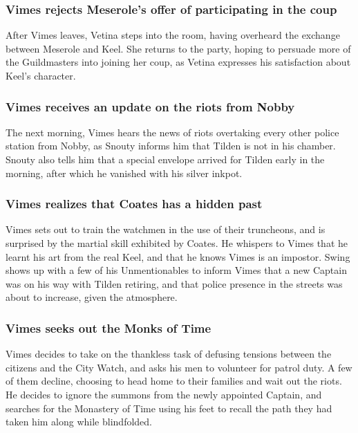 \subsubsection{\Gls{Vimes} rejects \Gls{Meserole}'s offer of participating in the coup}
After \Gls{Vimes} leaves, \Gls{Vetina} steps into the room, having overheard the exchange between
\Gls{Meserole} and \Gls{Keel}. She returns to the party, hoping to persuade more of the Guildmasters
into joining her coup, as \Gls{Vetina} expresses his satisfaction about \Gls{Keel}'s character.

\subsubsection{\Gls{Vimes} receives an update on the riots from \Gls{Nobby}}
The next morning, \Gls{Vimes} hears the news of riots overtaking every other police station from
\Gls{Nobby}, as \Gls{Snouty} informs him that \Gls{Tilden} is not in his chamber. \Gls{Snouty} also
tells him that a special envelope arrived for \Gls{Tilden} early in the morning, after which he
vanished with his silver inkpot.

\subsubsection{\Gls{Vimes} realizes that \Gls{Coates} has a hidden past}
\Gls{Vimes} sets out to train the watchmen in the use of their truncheons, and is surprised by the
martial skill exhibited by \Gls{Coates}. He whispers to \Gls{Vimes} that he learnt his art from the
real \Gls{Keel}, and that he knows \Gls{Vimes} is an impostor. \Gls{Swing} shows up with a few of
his Unmentionables to inform \Gls{Vimes} that a new Captain was on his way with \Gls{Tilden}
retiring, and that police presence in the streets was about to increase, given the atmosphere.

\subsubsection{\Gls{Vimes} seeks out the Monks of Time}
\Gls{Vimes} decides to take on the thankless task of defusing tensions between the citizens and
the City Watch, and asks his men to volunteer for patrol duty. A few of them decline, choosing to
head home to their families and wait out the riots. He decides to ignore the summons from the newly
appointed Captain, and searches for the Monastery of Time using his feet to recall the path they
had taken him along while blindfolded.

